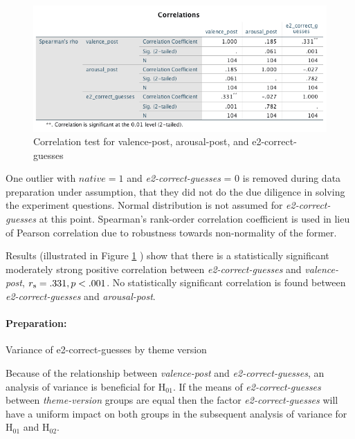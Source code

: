 	\begin{figure}
		\centering
		\includegraphics[width=1\linewidth]{graphics/correlationE2-correct-guesses-affect-post}
		\caption{Correlation test for valence-post, arousal-post, and e2-correct-guesses}
		\label{fig:correlatione2-correct-guesses-affect-post}
	\end{figure}
	
	One outlier with \(native = 1\) and \textit{e2-correct-guesses} = 0 is removed during data preparation under assumption, that they did not do the due diligence in solving the experiment questions. Normal distribution is not assumed for \textit{e2-correct-guesses} at this point. Spearman's rank-order correlation coefficient is used in lieu of Pearson correlation due to robustness towards non-normality of the former.
	
	
	Results (illustrated in Figure \ref{fig:correlatione2-correct-guesses-affect-post} ) show that there is a statistically significant moderately strong positive correlation between \textit{e2-correct-guesses} and \textit{valence-post}, $ r\textsubscript{s} = .331, p < .001$.
	No statistically significant correlation is found between \textit{e2-correct-guesses} and \textit{arousal-post}.
	
	\paragraph{Preparation:} Variance of e2-correct-guesses by theme version
	
	Because of the relationship between \textit{valence-post} and \textit{e2-correct-guesses}, an analysis of variance is beneficial for H$_{01}$. If the means of \textit{e2-correct-guesses} between \textit{theme-version} groups are equal then the factor \textit{e2-correct-guesses} will have a uniform impact on both groups in the subsequent analysis of variance for H$_{01}$ and H$_{02}$.
	
